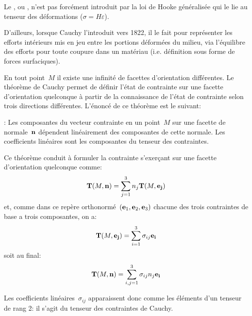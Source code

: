 \begin{histoire}%
Le , ou , n'est pas forcément introduit par la loi de Hooke généralisée qui le lie au tenseur des déformations ($\sigma=H\varepsilon$).

\medskip
D'ailleurs, lorsque Cauchy l'introduit vers 1822, il le fait pour représenter les efforts intérieurs mis en jeu entre les portions déformées du milieu, via l'équilibre des efforts pour toute coupure
dans un matériau (i.e. définition sous forme de forces surfaciques).

\medskip
En tout point~$M$ il existe une infinité de facettes d'orientation différentes.
 Le théorème de Cauchy  permet de définir l'état de contrainte sur une facette d'orientation quelconque à partir de la connaissance de l'état de contrainte selon trois directions différentes. L'énoncé de ce théorème est le suivant:

\begin{theoreme} :
Les composantes du vecteur contrainte en un point~$M$ sur une facette de normale~$\mathbf{n}$ dépendent linéairement des composantes de cette normale. Les coefficients linéaires sont les composantes du tenseur des contraintes.
\end{theoreme}

\medskip{}
Ce théorème conduit à formuler la contrainte s'exerçant sur une facette d'orientation quelconque comme:
\begin{equation}
\mathbf{T}(M,\mathbf{n}) = \displaystyle\sum_{j=1}^3 n_j \mathbf{T}(M,\mathbf{e_j})
\end{equation}
et, comme dans ce repère orthonormé~$(\mathbf{e}_1,\mathbf{e}_2,\mathbf{e}_3)$ chacune des trois contraintes de base a trois composantes, on a:
\begin{equation}
\mathbf{T}(M,\mathbf{e_j}) = \displaystyle\sum_{i=1}^3 \sigma_{ij}\mathbf{e_i}
\end{equation}
soit au final:
\begin{equation}
\mathbf{T}(M,\mathbf{n}) = \displaystyle\sum_{i,j=1}^3 \sigma_{ij}n_j\mathbf{e_i}
\end{equation}

Les coefficients linéaires~$\sigma_{ij}$ apparaissent donc comme les éléments d'un tenseur de rang 2: il s'agit du tenseur des contraintes de Cauchy.
\end{histoire}

